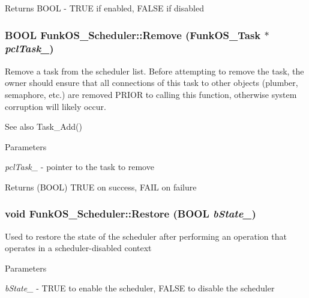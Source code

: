\begin{DoxyReturn}{Returns}
BOOL -\/ TRUE if enabled, FALSE if disabled 
\end{DoxyReturn}
\subsubsection[{Remove}]{\setlength{\rightskip}{0pt plus 5cm}BOOL FunkOS\_\-Scheduler::Remove ({\bf FunkOS\_\-Task} $\ast$ {\em pclTask\_\-})\hspace{0.3cm}{\ttfamily  [static]}}\label{class_funk_o_s___scheduler_a1f0af65f997c665dc65215d49c3e5fd8}
Remove a task from the scheduler list. Before attempting to remove the task, the owner should ensure that all connections of this task to other objects (plumber, semaphore, etc.) are removed PRIOR to calling this function, otherwise system corruption will likely occur.

\begin{DoxySeeAlso}{See also}
Task\_\-Add() 
\end{DoxySeeAlso}

\begin{DoxyParams}{Parameters}
\item[{\em pclTask\_\-}]-\/ pointer to the task to remove \end{DoxyParams}
\begin{DoxyReturn}{Returns}
(BOOL) TRUE on success, FAIL on failure 
\end{DoxyReturn}
\subsubsection[{Restore}]{\setlength{\rightskip}{0pt plus 5cm}void FunkOS\_\-Scheduler::Restore (BOOL {\em bState\_\-})\hspace{0.3cm}{\ttfamily  [static]}}\label{class_funk_o_s___scheduler_a8c6c4af561f98c7bcee855cb5e8d3e8f}
Used to restore the state of the scheduler after performing an operation that operates in a scheduler-\/disabled context


\begin{DoxyParams}{Parameters}
\item[{\em bState\_\-}]-\/ TRUE to enable the scheduler, FALSE to disable the scheduler \end{DoxyParams}
